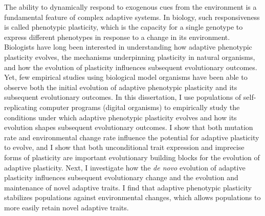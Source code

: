 

The ability to dynamically respond to exogenous cues from the environment is a fundamental feature of complex adaptive systems.
In biology, such responsiveness is called phenotypic plasticity, which is the capacity for a single genotype to express different phenotypes in response to a change in its environment.
Biologists have long been interested in understanding how adaptive phenotypic plasticity evolves, the mechanisms underpinning plasticity in natural organisms, and how the evolution of plasticity influences subsequent evolutionary outcomes.
Yet, few empirical studies using biological model organisms have been able to observe both the initial evolution of adaptive phenotypic plasticity and its subsequent evolutionary outcomes.
In this dissertation, I use populations of self-replicating computer programs (digital organisms) to empirically study the conditions under which adaptive phenotypic plasticity evolves and how its evolution shapes subsequent evolutionary outcomes.
I show that both mutation rate and environmental change rate influence the potential for adaptive plasticity to evolve, and I show that both unconditional trait expression and imprecise forms of plasticity are important evolutionary building blocks for the evolution of adaptive plasticity. 
Next, I investigate how the \textit{de novo} evolution of adaptive plasticity influences subsequent evolutionary change and the evolution and maintenance of novel adaptive traits.
I find that adaptive phenotypic plasticity stabilizes populations against environmental changes, which allows populations to more easily retain novel adaptive traits. 

